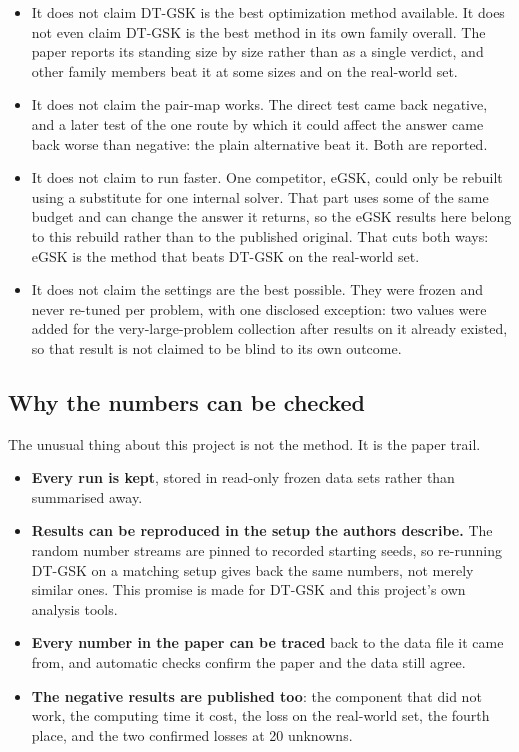 \documentclass[11pt,a4paper]{article}
\newcommand{\hl}[1]{\textbf{#1}}
\begin{document}
\begin{itemize}[leftmargin=1.2em, itemsep=2pt, topsep=3pt]
\item It does not claim DT-GSK is the best optimization method available. It does
      not even claim DT-GSK is the best method in its own family overall. The
      paper reports its standing size by size rather than as a single verdict,
      and other family members beat it at some sizes and on the real-world set.
\item It does not claim the pair-map works. The direct test came back
      negative, and a later test of the one route by which it could affect the
      answer came back worse than negative: the plain alternative beat it.
      Both are reported.
\item It does not claim to run faster. One competitor, eGSK, could only be
      rebuilt using a substitute for one internal solver. That part uses some of
      the same budget and can change the answer it returns, so the eGSK results
      here belong to this rebuild rather than to the published original. That
      cuts both ways: eGSK is the method that beats DT-GSK on the real-world set.
\item It does not claim the settings are the best possible. They were frozen and
      never re-tuned per problem, with one disclosed exception: two values were
      added for the very-large-problem collection after results on it already
      existed, so that result is not claimed to be blind to its own outcome.
\end{itemize}

\subsection{Why the numbers can be checked}

The unusual thing about this project is not the method. It is the paper trail.

\begin{itemize}[leftmargin=1.2em, itemsep=2pt, topsep=3pt]
\item \hl{Every run is kept}, stored in read-only frozen data sets rather than
      summarised away.
\item \hl{Results can be reproduced in the setup the authors describe.} The
      random number streams are pinned to recorded starting seeds, so re-running
      DT-GSK on a matching setup gives back the same numbers, not merely similar
      ones. This promise is made for DT-GSK and this project's own analysis
      tools.
\item \hl{Every number in the paper can be traced} back to the data file it came
      from, and automatic checks confirm the paper and the data still agree.
\item \hl{The negative results are published too}: the component that did not
      work, the computing time it cost, the loss on the real-world set, the
      fourth place, and the two confirmed losses at 20 unknowns.
\end{itemize}
\end{document}
